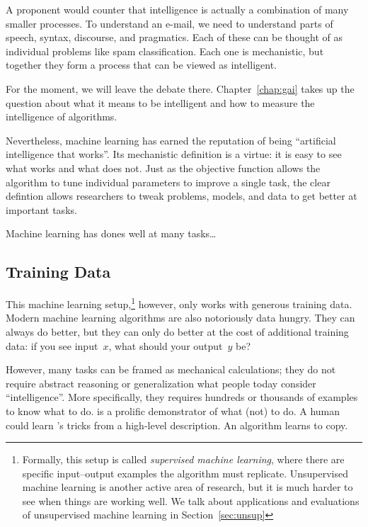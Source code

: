 A proponent would counter that intelligence is actually a combination
of many smaller processes.  To understand an e-mail, we need to
understand parts of speech, syntax, discourse, and pragmatics.  Each
of these can be thought of as individual problems like spam
classification.  Each one is mechanistic, but together they form a
process that can be viewed as intelligent.

For the moment, we will leave the debate there.
Chapter~\ref{chap:gai} takes up the question about what it means to be
intelligent and how to measure the intelligence of algorithms.

Nevertheless, machine learning has earned the reputation of being
``artificial intelligence that works''.  Its mechanistic definition is
a virtue: it is easy to see what works and what does not.  Just as the
objective function allows the algorithm to tune individual parameters
to improve a single task, the clear defintion allows researchers to
tweak problems, models, and data to get better at important tasks.

Machine learning has dones well at many tasks\dots

\subsection{Training Data}

This machine learning setup,\footnote{Formally, this setup is called
  \emph{supervised machine learning}, where there are specific
  input--output examples the algorithm must replicate.  Unsupervised
  machine learning is another active area of research, but it is much
  harder to see when things are working well.  We talk about
  applications and evaluations of unsupervised machine learning in
  Section~\ref{sec:unsup}} however, only works with generous training
data.  Modern machine learning algorithms are also notoriously data
hungry.  They can always do better, but they can only do better at the
cost of additional training data: if you see input~$x$, what should
your output~$y$ be?

However, many tasks can be framed as mechanical calculations; they
do not require abstract reasoning or generalization what people today
consider ``intelligence''.  More specifically, they requires hundreds
or thousands of examples to know what to do.  \energyJerk{} is a
prolific demonstrator of what (not) to do.  A human could learn
\energyJerk{}'s tricks from a high-level description.  An algorithm
learns to copy. 

